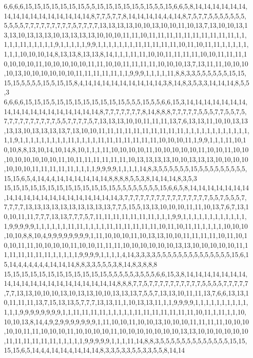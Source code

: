 6,6,6,6,15,15,15,15,15,15,15,5,5,15,15,15,15,15,5,15,5,5,15,6,6,5,8,14,14,14,14,14,14,14,14,14,14,14,14,14,14,14,14,8,7,7,5,7,7,8,14,14,14,14,4,4,14,8,7,5,7,7,5,5,5,5,5,5,5,5,5,5,5,7,7,7,7,7,7,7,7,7,5,7,7,7,7,13,13,13,13,10,10,13,10,10,11,10,13,7,13,10,10,13,13,13,10,13,13,13,10,13,13,13,13,10,10,10,11,11,10,11,11,11,11,11,11,11,11,11,11,1,1,1,1,1,11,1,1,1,1,1,9,1,1,1,1,1,9,9,1,1,1,1,1,1,1,11,11,11,11,11,10,11,10,11,11,1,1,1,1,1,1,1,1,10,10,10,14,8,13,13,8,13,13,8,14,1,1,1,11,11,10,10,11,11,11,11,10,10,11,11,11,10,10,10,10,11,10,10,10,10,10,11,11,10,10,11,11,11,11,10,10,10,13,7,13,11,11,10,10,10,10,13,10,10,10,10,10,10,11,11,11,11,11,1,1,9,9,9,1,1,1,1,11,8,8,3,3,5,5,5,5,5,5,15,15,15,15,5,5,5,5,15,5,15,15,8,4,14,14,14,14,14,14,14,14,14,3,8,14,8,3,5,3,3,14,14,14,8,5,5,3
6,6,6,6,15,15,15,5,15,15,15,15,15,15,15,15,5,5,5,15,5,5,6,6,15,3,14,14,14,14,14,14,14,14,14,14,14,14,14,14,14,14,14,14,8,7,7,7,7,7,7,7,8,14,8,8,8,7,7,7,7,7,5,5,5,7,7,5,5,7,5,7,7,7,7,7,7,7,7,7,7,5,5,7,7,7,7,5,7,13,13,13,10,10,11,11,11,13,7,6,13,13,11,10,10,13,13,13,13,10,13,13,13,13,7,13,10,10,11,11,11,11,11,11,11,11,11,11,1,1,1,1,1,1,1,1,1,1,1,1,1,1,9,1,1,1,1,1,1,1,1,1,11,1,1,1,1,11,11,11,11,11,11,11,10,10,10,11,1,9,9,1,1,1,11,10,10,10,8,8,13,10,14,10,14,8,10,1,1,1,11,10,10,10,10,11,10,10,10,10,10,11,10,10,11,10,10,10,10,10,10,10,10,11,10,11,11,11,11,11,11,10,13,13,13,13,10,10,13,13,13,10,10,10,10,10,10,10,11,11,11,11,11,1,1,1,1,9,9,9,9,1,1,1,1,14,8,3,5,5,5,5,5,5,15,5,5,5,5,5,5,5,5,5,15,15,6,5,4,14,4,4,14,14,14,14,14,14,8,8,8,8,5,5,3,8,14,14,14,8,3,5,3
15,15,15,15,15,15,15,15,15,15,15,15,15,5,5,5,5,5,5,5,5,15,6,6,5,8,14,14,14,14,14,14,14,14,14,14,14,14,14,14,14,14,14,14,14,14,3,7,7,7,7,7,7,7,7,7,7,7,7,7,7,7,7,5,5,7,5,5,5,7,7,7,7,7,13,13,13,13,13,13,13,13,13,13,7,7,5,15,5,13,13,10,10,10,11,11,10,13,7,6,7,13,10,10,11,11,7,7,7,13,13,7,7,7,5,7,11,11,11,11,11,11,11,1,1,1,9,9,1,1,1,1,1,1,1,1,1,1,1,1,1,9,9,9,9,9,1,1,1,1,1,1,11,11,1,1,1,1,11,11,11,11,11,11,10,11,10,11,11,1,1,1,1,10,10,10,10,10,8,8,10,4,9,9,9,9,9,9,9,9,1,11,10,10,10,11,10,13,13,10,10,11,11,11,11,10,11,10,10,10,11,11,10,10,10,10,11,10,10,11,11,11,10,10,10,10,10,10,13,13,10,10,10,10,10,11,11,11,11,11,11,11,1,1,1,1,1,9,9,9,9,1,1,1,1,4,14,3,3,3,3,5,5,5,5,5,5,5,5,5,5,5,5,5,5,15,6,15,14,4,4,4,4,4,4,14,14,14,8,8,3,3,5,5,5,3,8,14,8,3,8,8,8
15,15,15,15,15,15,15,15,15,15,15,15,5,5,5,5,5,3,5,5,5,6,6,15,3,8,14,14,14,14,14,14,14,14,14,14,14,14,14,14,14,14,14,14,14,14,8,8,8,7,7,5,7,7,7,7,7,7,7,7,7,7,5,5,5,5,7,7,7,7,7,7,7,13,13,10,10,10,13,10,13,13,10,10,13,13,13,7,5,5,7,13,13,10,11,11,13,7,6,6,13,13,10,11,11,11,13,7,15,13,13,5,7,7,7,13,13,11,1,10,13,13,11,1,1,9,9,9,9,1,1,1,1,1,1,1,1,1,1,1,1,1,9,9,9,9,9,9,9,9,1,1,11,11,11,11,1,1,1,1,1,11,11,11,11,11,11,11,10,11,1,11,1,1,10,10,10,13,8,14,4,9,2,9,9,9,9,9,9,9,1,11,10,10,11,10,10,13,10,10,10,11,11,11,11,10,10,10,10,10,11,11,10,10,10,11,10,10,10,10,11,10,10,10,10,10,10,10,13,13,10,10,10,10,10,10,11,11,11,11,11,11,1,1,1,1,1,9,9,9,9,9,1,1,1,11,14,8,8,3,5,5,5,5,5,5,5,5,5,5,5,5,5,15,15,15,15,6,5,14,4,4,14,14,4,14,14,14,8,3,3,5,3,3,5,5,3,3,5,5,8,14,14

